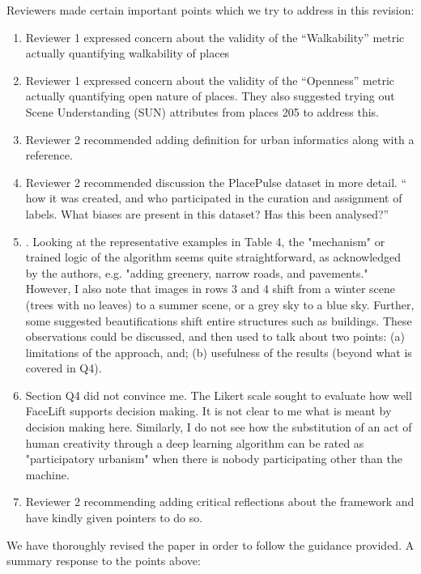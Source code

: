 \documentclass{paper}
\newenvironment{myquote}
{\definecolor{shadecolor}{rgb}{0.9,0.95,1} \begin{shaded*} \sf \em}
{\em\end{shaded*}}
\begin{document}
\begin{myquote}

\noindent Reviewers made certain important points which we try to address in this revision:

\begin{enumerate}
\item Reviewer 1 expressed concern about the validity of the ``Walkability'' metric actually quantifying walkability of places
\item Reviewer 1 expressed concern about the validity of the ``Openness'' metric actually quantifying open nature of places. They also suggested trying out Scene Understanding (SUN) attributes from places 205 to address this. 
\item Reviewer 2 recommended adding definition for urban informatics along with a reference.
\item Reviewer 2 recommended discussion the PlacePulse dataset in more detail. `` how it was created, and who participated in the curation and assignment of labels. What biases are present in this dataset? Has this been analysed?''
\item . Looking at the representative examples in Table 4, the "mechanism" or trained logic of the algorithm seems quite straightforward, as acknowledged by the authors, e.g. "adding greenery, narrow roads, and pavements." However, I also note that images in rows 3 and 4 shift from a winter scene (trees with no leaves) to a summer scene, or a grey sky to a blue sky. Further, some suggested beautifications shift entire structures such as buildings. These observations could be discussed, and then used to talk about two points: (a) limitations of the approach, and; (b) usefulness of the results (beyond what is covered in Q4). 
\item Section Q4 did not convince me. The Likert scale sought to evaluate how well FaceLift supports decision making. It is not clear to me what is meant by decision making here. Similarly, I do not see how the substitution of an act of human creativity through a deep learning algorithm can be rated as "participatory urbanism" when there is nobody participating other than the machine. 
\item Reviewer 2 recommending adding critical reflections about the framework and have kindly given pointers to do so.
\end{enumerate}

\end{myquote}

\noindent We have thoroughly revised the paper in order to follow the guidance provided. A summary response to the points above:
\end{document}
